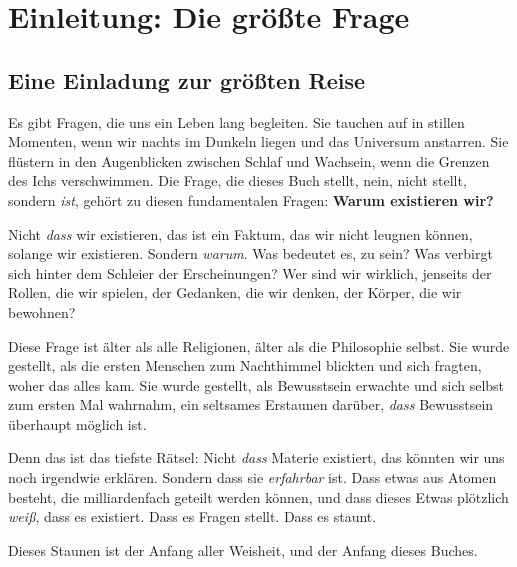 
\chapter{Einleitung: Die größte Frage}

\section{Eine Einladung zur größten Reise}

Es gibt Fragen, die uns ein Leben lang begleiten. Sie tauchen auf in stillen Momenten, wenn wir nachts im Dunkeln liegen und das Universum anstarren. Sie flüstern in den Augenblicken zwischen Schlaf und Wachsein, wenn die Grenzen des Ichs verschwimmen. Die Frage, die dieses Buch stellt, nein, nicht stellt, sondern \emph{ist}, gehört zu diesen fundamentalen Fragen: \textbf{Warum existieren wir?}

Nicht \emph{dass} wir existieren, das ist ein Faktum, das wir nicht leugnen können, solange wir existieren. Sondern \emph{warum}. Was bedeutet es, zu sein? Was verbirgt sich hinter dem Schleier der Erscheinungen? Wer sind wir wirklich, jenseits der Rollen, die wir spielen, der Gedanken, die wir denken, der Körper, die wir bewohnen?

Diese Frage ist älter als alle Religionen, älter als die Philosophie selbst. Sie wurde gestellt, als die ersten Menschen zum Nachthimmel blickten und sich fragten, woher das alles kam. Sie wurde gestellt, als Bewusstsein erwachte und sich selbst zum ersten Mal wahrnahm, ein seltsames Erstaunen darüber, \emph{dass} Bewusstsein überhaupt möglich ist.

Denn das ist das tiefste Rätsel: Nicht \emph{dass} Materie existiert, das könnten wir uns noch irgendwie erklären. Sondern dass sie \emph{erfahrbar} ist. Dass etwas aus Atomen besteht, die milliardenfach geteilt werden können, und dass dieses Etwas plötzlich \emph{weiß}, dass es existiert. Dass es Fragen stellt. Dass es staunt.

Dieses Staunen ist der Anfang aller Weisheit, und der Anfang dieses Buches.

